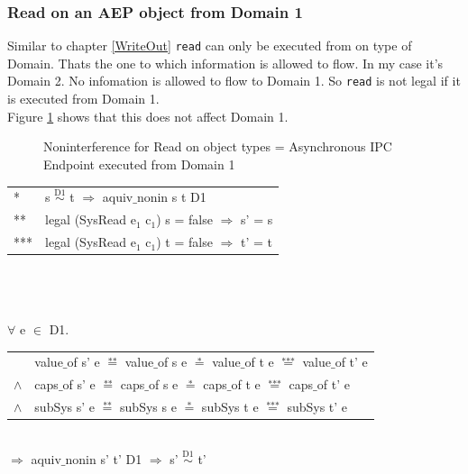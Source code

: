 \documentclass[pdftex,11pt,a4paper,twoside]{article}
\begin{document}
\subsubsection{Read on an AEP object from Domain 1}
Similar to chapter \ref{WriteOut} \texttt{read} can only be executed from on type of Domain. Thats the one to which information is allowed to flow. In my case it's Domain 2. No infomation is allowed to flow to Domain 1. So \texttt{read} is not legal if it is executed from Domain 1.\\
Figure \ref{fig:ReadOut} shows that this does not affect Domain 1. 
\begin{flushleft}
\begin{figure}[H]
\caption{Noninterference for Read on object types = Asynchronous IPC Endpoint executed from Domain 1}
\label{fig:ReadOut}
\end{figure}
\end{flushleft} 
\begin{tabular}{ll}
* & s $\overset{\text{D1}}{\sim}$ t $\Rightarrow$ aquiv$\_$nonin s t D1	\\ 
** & legal (SysRead e$_1$ c$_1$) s = false $\Rightarrow$ s' = s \\ 
*** & legal (SysRead e$_1$ c$_1$) t = false $\Rightarrow$ t' = t
\end{tabular} \\ \\ \\
$\forall$ e $\in$ D1. \\ 
\begin{tabular}{ll}
& value$\_$of s' e $\overset{\text{**}}{=}$ value$\_$of s e $\overset{\text{*}}{=}$ value$\_$of t e $\overset{\text{***}}{=}$ value$\_$of t' e \\
$\wedge$ & caps$\_$of s' e $\overset{\text{**}}{=}$ caps$\_$of s e $\overset{\text{*}}{=}$ caps$\_$of t e $\overset{\text{***}}{=}$ caps$\_$of t' e \\
$\wedge$ & subSys s' e $\overset{\text{**}}{=}$ subSys s e $\overset{\text{*}}{=}$ subSys t e $\overset{\text{***}}{=}$ subSys t' e
\end{tabular} \\
$\Rightarrow$ aquiv$\_$nonin s' t' D1 $\Rightarrow$ s' $\overset{\text{D1}}{\sim}$ t'
\end{document}
